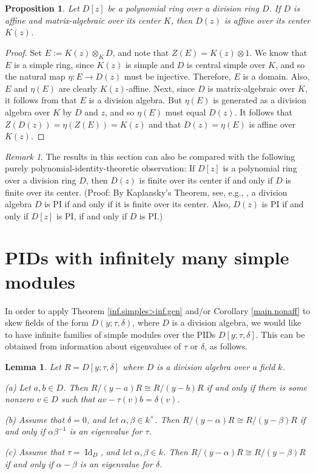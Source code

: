 \documentclass{conm-p-l}
\newtheorem{lem}[theorem]{Lemma}
\newtheorem{prop}[theorem]{Proposition}
\theoremstyle{definition}
\theoremstyle{remark}
\newtheorem{rem}[theorem]{Remark}
\numberwithin{equation}{section}
\DeclareMathOperator{\Id}{Id}
\newcommand{\kx}{k^\times}
\begin{document}
\begin{prop}
Let $D[z]$ be a polynomial ring over a division ring $D$.  If $D$ is affine and matrix-algebraic over its center $K$, then $D(z)$ is affine over its center $K(z)$.
\end{prop}

\begin{proof}
Set $E := K(z) \otimes_K D$, and note that $Z(E) = K(z) \otimes 1$. We know that $E$ is a simple ring, since $K(z)$ is simple and $D$ is central simple over $K$, and so the natural map $\eta : E \rightarrow D(z)$ must be injective. Therefore, $E$ is a domain. Also, $E$ and $\eta(E)$ are clearly $K(z)$-affine. Next, since $D$ is matrix-algebraic over $K$, it follows from \cite[Theorem 17.2]{Goo-War} that $E$ is a division algebra. But $\eta(E)$ is generated as a division algebra over $K$ by $D$ and $z$, and so $\eta(E)$ must equal $D(z)$. It follows that $Z(D(z)) = \eta(Z(E)) = K(z)$ and that $D(z) = \eta(E)$ is affine over $K(z)$.
\end{proof}


\begin{rem}
The results in this section can also be compared with the following purely polynomial-identity-theoretic observation: If $D[z]$ is a polynomial ring over a division ring $D$, then $D(z)$ is finite over its center if and only if $D$ is finite over its center.
(Proof: By Kaplansky's Theorem, see, e.g., \cite[Theorem 13.3.8]{McC-Rob}, a division algebra $D$ is PI if and only if it is finite over its center.  Also, $D(z)$ is PI if and only if $D[z]$ is PI, if and only if $D$ is PI.)
\end{rem}


\section{PIDs with infinitely many simple modules}

In order to apply Theorem \ref{inf.simples>inf.gen} and/or Corollary \ref{main.nonaff} to skew fields of the form $D(y;\tau,\delta)$, where $D$ is a division algebra, we would like to have infinite families of simple modules over  the PIDs $D[y;\tau,\delta]$.  This can be obtained from information about eigenvalues of $\tau$ or $\delta$, as follows.

\begin{lem}  \label{iso.simples.vs.eigenvals}
Let $R = D[y;\tau,\delta]$ where $D$ is a division algebra over a field $k$.

{\rm(a)} Let $a,b \in D$.  Then $R/(y-a)R \cong R/(y-b)R$ if and only if there is some nonzero $v\in D$ such that $av-\tau(v)b = \delta(v)$.

{\rm(b)} Assume that $\delta = 0$, and let $\alpha,\beta \in \kx$.  Then $R/(y-\alpha)R \cong R/(y-\beta)R$ if and only if $\alpha\beta^{-1}$ is an eigenvalue for $\tau$.

{\rm(c)} Assume that $\tau = \Id_D$, and let $\alpha,\beta \in k$. Then $R/(y-\alpha)R \cong R/(y-\beta)R$ if and only if $\alpha - \beta$ is an eigenvalue for $\delta$.
\end{lem}
\end{document}
